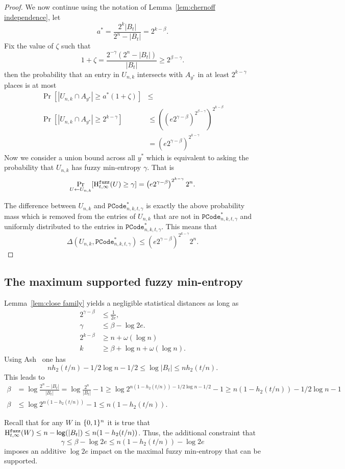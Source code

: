\begin{proof}
\noindent
We now continue using the notation of Lemma~\ref{lem:chernoff independence}, let 
\[
a^* =\frac{2^k|B_t|}{2^n - |B_t|}=2^{k-\beta}.
\]
Fix the value of $\zeta$ such that 
\[1+\zeta = \frac{2^{-\gamma}(2^n - |B_t|)}{|B_t|} \ge 2^{\beta-\gamma}. \]
then the probability that an entry in $U_{n,k}$ intersects with $A_{y^*}$ in at least $2^{k-\gamma}$ places is at most 
\begin{align*}
\Pr[|U_{n,k} \cap A_{y^*}| \ge a^*(1+\zeta)] &\le \\
\Pr[| U_{n,k} \cap A_{y^*} | \ge 2^{k-\gamma}] &\le \left(\left(e2^{\gamma-\beta}\right)^{2^{\beta-\gamma}}\right)^{2^{k-\beta}} \\&= \left(e2^{\gamma-\beta}\right)^{2^{k-\gamma}}
\end{align*}
Now we consider a union bound across all $y^*$ which is equivalent to asking the probability that $U_{n,k}$ has fuzzy min-entropy $\gamma$.  That is
\[
\Pr_{U\leftarrow U_{n,k}}[\mathrm{H}^{\mathtt{fuzz}}_{t,\infty}(U)\ge \gamma] = \left(e2^{\gamma-\beta}\right)^{2^{k-\gamma}}2^n.
\]

The difference between $U_{n,k}$ and $\mathtt{PCode}_{n, k, t, \gamma}^{*}$ is exactly the above probability mass which is removed from the entries of $U_{n,k}$ that are not in $\mathtt{PCode}_{n, k, t, \gamma}^{*}$ and uniformly distributed to the entries in $\mathtt{PCode}_{n, k, t, \gamma}^{*}$.  This means that 
\[
\Delta(U_{n,k}, \mathtt{PCode}_{n, k, t, \gamma}^{*}) \le \left(e2^{\gamma-\beta}\right)^{2^{k-\gamma}}2^n.
\]
\end{proof}

\subsection{The maximum supported fuzzy min-entropy}
\label{ssec:how much fuzzy}
 Lemma~\ref{lem:close family} yields a negligible statistical distances as long as 
\begin{align*}
2^{\gamma - \beta} &\le \frac{1}{2e},\\
 \gamma &\le \beta -\log{2e}.\\
2^{k-\beta}&\ge n+\omega(\log n)\\
k &\ge \beta + \log{n+ \omega(\log{n})}.
\end{align*}
Using Ash~\cite[Lemma 4.7.2, Equation 4.7.5, p. 115]{ash2012information} one has
\[ nh_2(t/n)  -1/2\log{n} - 1/2 \le \log{|B_t|} \le  nh_2(t/n).\]
This leads to 
\begin{align*}
\beta &= \log{\frac{2^n - |B_t|}{|B_t|}} = \log{\frac{2^n}{|B_t|} -1} \ge \log{2^{n(1-h_2(t/n)) - 1/2 \log{n}-1/2} -1} \ge n(1-h_2(t/n)) - 1/2\log{n}-1\\
\beta&\le \log{2^{n(1-h_2(t/n))} -1} \le n(1-h_2(t/n)).
\end{align*}

Recall that for any $W$ in $\{0, 1\}^n$ it is true that $\mathrm{H}^{\mathtt{fuzz}}_{t,\infty}(W) \le n -\mathsf{log}\!\left(|B_t|\right) \le n(1-h_2(t/n))$.  Thus, the additional constraint that 
\[
\gamma \le \beta - \log{2e}
\le n(1-h_2(t/n)) - \log{2e}\] imposes an additive $\log{2e}$ impact on the maximal fuzzy min-entropy that can be supported. 
